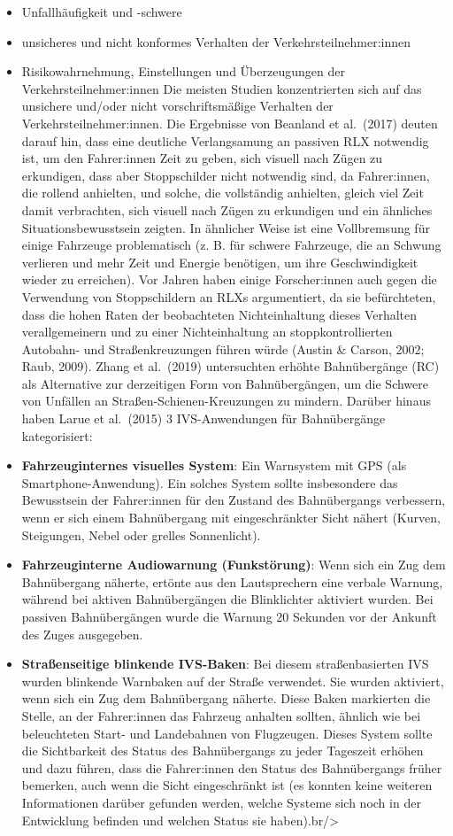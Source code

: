 \documentclass[
]{book}
\begin{document}
\begin{itemize}
\item
  Unfallhäufigkeit und -schwere
\item
  unsicheres und nicht konformes Verhalten der Verkehrsteilnehmer:innen
\item
  Risikowahrnehmung, Einstellungen und Überzeugungen der Verkehrsteilnehmer:innen
  Die meisten Studien konzentrierten sich auf das unsichere und/oder nicht vorschriftsmäßige Verhalten der Verkehrsteilnehmer:innen.
  Die Ergebnisse von Beanland et al.~(2017) deuten darauf hin, dass eine deutliche Verlangsamung an passiven RLX notwendig ist, um den Fahrer:innen Zeit zu geben, sich visuell nach Zügen zu erkundigen, dass aber Stoppschilder nicht notwendig sind, da Fahrer:innen, die rollend anhielten, und solche, die vollständig anhielten, gleich viel Zeit damit verbrachten, sich visuell nach Zügen zu erkundigen und ein ähnliches Situationsbewusstsein zeigten. In ähnlicher Weise ist eine Vollbremsung für einige Fahrzeuge problematisch (z. B. für schwere Fahrzeuge, die an Schwung verlieren und mehr Zeit und Energie benötigen, um ihre Geschwindigkeit wieder zu erreichen). Vor Jahren haben einige Forscher:innen auch gegen die Verwendung von Stoppschildern an RLXs argumentiert, da sie befürchteten, dass die hohen Raten der beobachteten Nichteinhaltung dieses Verhalten verallgemeinern und zu einer Nichteinhaltung an stoppkontrollierten Autobahn- und Straßenkreuzungen führen würde (Austin \& Carson, 2002; Raub, 2009). Zhang et al.~(2019) untersuchten erhöhte Bahnübergänge (RC) als Alternative zur derzeitigen Form von Bahnübergängen, um die Schwere von Unfällen an Straßen-Schienen-Kreuzungen zu mindern. Darüber hinaus haben Larue et al.~(2015) 3 IVS-Anwendungen für Bahnübergänge kategorisiert:
\item
  \textbf{Fahrzeuginternes visuelles System}: Ein Warnsystem mit GPS (als Smartphone-Anwendung). Ein solches System sollte insbesondere das Bewusstsein der Fahrer:innen für den Zustand des Bahnübergangs verbessern, wenn er sich einem Bahnübergang mit eingeschränkter Sicht nähert (Kurven, Steigungen, Nebel oder grelles Sonnenlicht).
\item
  \textbf{Fahrzeuginterne Audiowarnung (Funkstörung)}: Wenn sich ein Zug dem Bahnübergang näherte, ertönte aus den Lautsprechern eine verbale Warnung, während bei aktiven Bahnübergängen die Blinklichter aktiviert wurden. Bei passiven Bahnübergängen wurde die Warnung 20 Sekunden vor der Ankunft des Zuges ausgegeben.
\item
  \textbf{Straßenseitige blinkende IVS-Baken}: Bei diesem straßenbasierten IVS wurden blinkende Warnbaken auf der Straße verwendet. Sie wurden aktiviert, wenn sich ein Zug dem Bahnübergang näherte. Diese Baken markierten die Stelle, an der Fahrer:innen das Fahrzeug anhalten sollten, ähnlich wie bei beleuchteten Start- und Landebahnen von Flugzeugen. Dieses System sollte die Sichtbarkeit des Status des Bahnübergangs zu jeder Tageszeit erhöhen und dazu führen, dass die Fahrer:innen den Status des Bahnübergangs früher bemerken, auch wenn die Sicht eingeschränkt ist (es konnten keine weiteren Informationen darüber gefunden werden, welche Systeme sich noch in der Entwicklung befinden und welchen Status sie haben).br/\textgreater{}

\end{itemize}
\end{document}
